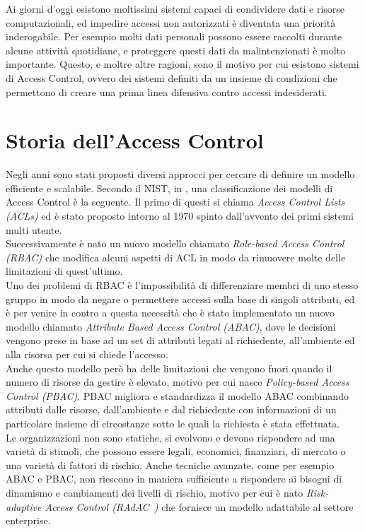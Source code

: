 \newcommand{\radac}{RAdAC\ }
\label{cap:accessControl}
Ai giorni d'oggi esistono moltissimi sistemi capaci di condividere dati e risorse computazionali, 
ed impedire accessi non autorizzati è diventata una priorità inderogabile.
Per esempio molti dati personali possono essere raccolti durante alcune attività quotidiane, e proteggere questi dati
da malintenzionati è molto importante.
Questo, e moltre altre ragioni, sono il motivo per cui esistono sistemi di Access Control, ovvero dei sistemi definiti da un insieme di condizioni 
che permettono di creare una prima linea difensiva contro accessi indesiderati.
\section{Storia dell'Access Control}
\label{sec:history}
Negli anni sono stati proposti diversi approcci per cercare di definire un modello efficiente e scalabile. Secondo il NIST, in \cite{NISTACM}, una classificazione dei modelli di Access Control è la seguente. 
Il primo di questi si chiama \textit{Access Control Lists (ACLs)} ed è stato proposto intorno al 1970 spinto dall'avvento dei primi sistemi multi utente.\\
Successivamente è nato un nuovo modello chiamato \textit{Role-based Access Control (RBAC)} che modifica alcuni aspetti di ACL  in modo da rimuovere molte delle limitazioni di quest'ultimo.\\
Uno dei problemi di RBAC è l'impossibilità di differenziare membri di uno stesso gruppo in modo da negare o permettere accessi sulla base di singoli attributi, ed è per venire in contro a questa necessità che è stato implementato un nuovo modello chiamato \textit{Attribute Based Access Control (ABAC)}, dove le decisioni vengono prese in base ad un set di attributi legati al richiedente, all'ambiente ed alla risorsa per cui si chiede l'accesso.\\
Anche questo modello però ha delle limitazioni che vengono fuori quando il numero di risorse da gestire è elevato, motivo per cui nasce \textit{Policy-based Access Control (PBAC)}.
PBAC migliora e standardizza il modello ABAC combinando attributi dalle risorse, dall'ambiente e dal richiedente con informazioni di un particolare insieme di circostanze sotto le quali la richiesta è stata effettuata.\\
Le organizzazioni non sono statiche, si evolvono e devono rispondere ad una varietà di stimoli, che possono essere legali, economici, finanziari, di mercato o una varietà di fattori di rischio.
Anche tecniche avanzate, come per esempio ABAC e PBAC, non riescono in maniera sufficiente a rispondere ai bisogni di dinamismo e cambiamenti dei livelli di rischio, motivo per cui è nato \textit{Risk-adaptive Access Control (\radac)} che fornisce un modello adattabile al settore enterprise.


